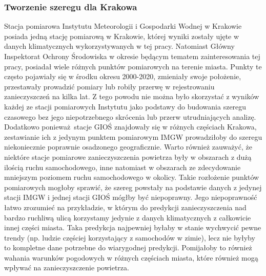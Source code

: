 \documentclass[10pt,a4paper]{article}
\begin{document}
\subsubsection{Tworzenie szeregu dla Krakowa}
\label{subsection:data:Krakow}
Stacja pomiarowa Instytutu Meteorologii i Gospodarki Wodnej w Krakowie posiada jedną stację pomiarową w Krakowie, której wyniki zostały ujęte w danych klimatycznych wykorzystywanych w tej pracy. Natomiast Główny Inspektorat Ochrony Środowiska w okresie będącym tematem zainteresowania tej pracy, posiadał wiele różnych punktów pomiarowych na terenie miasta. Punkty te często pojawiały się w środku okresu 2000-2020, zmieniały swoje położenie, przestawały prowadzić pomiary lub robiły przerwę w rejestrowaniu zanieczyszczeń na kilka lat. Z tego powodu nie można było skorzystać z wyników każdej ze stacji pomiarowych Instytutu jako podstawy do budowania szeregu czasowego bez jego niepotrzebnego skrócenia lub przerw utrudniających analizę. Dodatkowo ponieważ stacje GIOŚ znajdowały się w różnych częściach Krakowa, zestawianie ich z jedynym punktem pomiarowym IMGW prowadziłoby do szeregu niekoniecznie poprawnie osadzonego geograficznie. Warto również zauważyć, że niektóre stacje pomiarowe zanieczyszczenia powietrza były w obszarach z dużą ilością ruchu samochodowego, inne natomiast w obszarach ze zdecydowanie mniejszym poziomem ruchu samochodowego w okolicy. Takie rozłożenie punktów pomiarowych mogłoby sprawić, że szereg powstały na podstawie danych z jedynej stacji IMGW i jednej stacji GIOŚ mógłby być niepoprawny. Jego niepoprawność łatwo zrozumieć na przykładzie, w którym do predykcji zanieczyszczenia nad bardzo ruchliwą ulicą korzystamy jedynie z danych klimatycznych z całkowicie innej części miasta. Taka predykcja najpewniej byłaby w stanie wychwycić pewne trendy (np. ludzie częściej korzystający z samochodów w zimie), lecz nie byłyby to kompletne dane potrzebne do wiarygodnej predykcji. Pomijałoby to również wahania warunków pogodowych w różnych częściach miasta, które również mogą wpływać na zanieczyszczenie powietrza.
\end{document}
